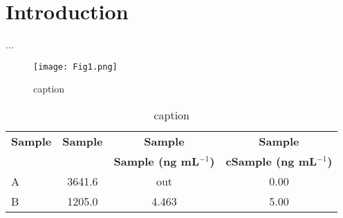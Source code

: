 \documentclass[a4paper, 12pt, epic, carom]{article}
\begin{document}
%



\fancyhead[RO]{\rightmark} 	%



\clearpage
{}			%




%
%
\section{Introduction}
...



\begin{figure}[!ht]
 \centering
\begin{minipage}[c]{0.90\textwidth}
	\centering
	\texttt{[image: Fig1.png]}
\end{minipage}
	\begin{minipage}[c]{0.99\textwidth}
 \centering
	\caption{caption}
	\label{fig:glu}
\end{minipage}
\end{figure}


\newpage
\begin{table*}[h]
\centering
	\begin{tabular}{|l|c|c|c|}
	 \rowcolor{defTableColor}
		\hline
		\textbf{Sample}   & \textbf{Sample} & \textbf{Sample} 								& \textbf{Sample}     								\\
		\textbf{$ $}   		& \textbf{$ $} 		& \textbf{Sample (ng mL$^{-1}$)} & \textbf{cSample (ng mL$^{-1}$)}     \\
		\hline
    {A}      					& 	{3641.6}   		& 	{out}       									& 		{0.00}           								\\
    {B}      					& 	{1205.0}   		& 	{4.463}     									& 		{5.00}            							\\
		\hline
	\end{tabular}
	\caption{caption} 
	\label{tab:tab1}%
\end{table*}
\end{document}
